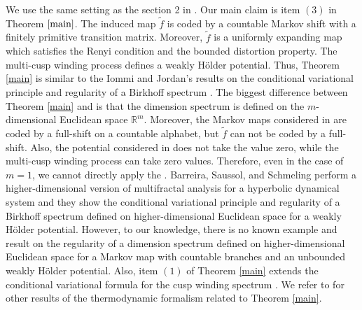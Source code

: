 \documentclass{article}
\theoremstyle{definition}
\begin{document}
We use the same setting as the section 2 in \cite{jaerisch2021mixed}. Our main claim is item $(3)$ in Theorem $\ref{main}$. The induced map $\tilde f$ is coded by a countable Markov shift with a finitely primitive transition matrix. Moreover, $\tilde f$ is a uniformly expanding map which satisfies the Renyi condition and the bounded distortion property. The multi-cusp winding process defines a weakly H\"older potential. Thus, Theorem \ref{main} is similar to the 
Iommi and Jordan's results on the conditional variational principle and regularity of a Birkhoff spectrum \cite[Theorem 1.3, and Theorem 1.4]{iommi2015multifractal}. The biggest difference between Theorem \ref{main} and \cite[Theorem 1.3, and Theorem 1.4]{iommi2015multifractal} is that the dimension spectrum is defined on the $m$-dimensional Euclidean space $\mathbb{R}^m$. Moreover, the Markov maps  considered in \cite{iommi2015multifractal} are coded by a full-shift on a countable alphabet, but  $\tilde f$ can not be coded by a full-shift. Also, the potential considered in \cite{iommi2015multifractal} does not take the value zero,  while the multi-cusp winding process can take zero values. Therefore, even in the case of $m=1$, we cannot directly apply the \cite[Theorem 1.3, and Theorem 1.4]{iommi2015multifractal}. Barreira, Saussol, and Schmeling \cite{barreira2002higher} perform a higher-dimensional version of multifractal analysis for a hyperbolic dynamical system and they show the conditional variational principle and regularity of a Birkhoff spectrum defined on higher-dimensional Euclidean space for a weakly H\"older potential. However, to our knowledge, there is no known example and result on 
the regularity of a dimension spectrum defined on higher-dimensional Euclidean space for a Markov map with countable branches and an unbounded weakly H\"older potential.  
Also, item $(1)$ of Theorem \ref{main} extends the conditional variational formula for the cusp winding spectrum \cite[Proposition 2.1]{jaerisch2021mixed}. We refer to  \cite{barany2021birkhoff,barreira2002higher,barreira2000sets,climenhaga2012topological,fan2015multifractal,iommi2015multifractal,iommi2015multifractale,iommi2017transience,jaerisch2021mixed,johansson2008multifractal,Jordan2017BirkhoffSF,Kessebhmer2007HigherdimensionalMV,rush2023multifractal} for 
other results of the thermodynamic formalism related to Theorem \ref{main}.
\end{document}
